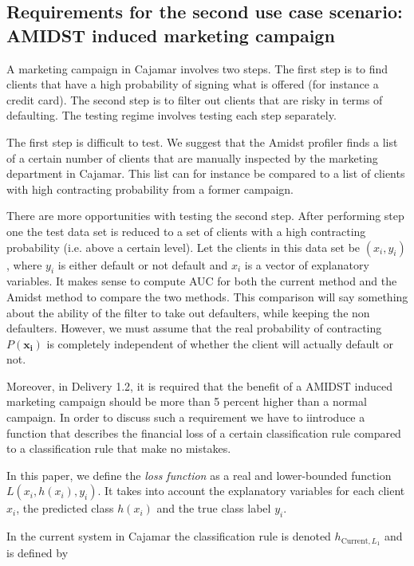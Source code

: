 \documentclass{article}
\theoremstyle{theorem}
\theoremstyle{definition}
\newcommand{\bv}[1]{\bm{#1}}
\begin{document}
\subsection{Requirements for the second use case scenario:  AMIDST induced marketing campaign}

A marketing campaign in Cajamar involves two steps.  The first step is to find clients that have a high probability of signing what is offered (for instance a credit card).  The second step is to filter out clients that are risky in terms of defaulting.
The testing regime involves testing each step separately.

The first step is difficult to test. We suggest that the Amidst profiler finds a list of a certain number of clients that are manually inspected by the marketing department in Cajamar. This list can for instance be compared to a list of clients with high contracting probability from a former campaign.

There are more opportunities with testing the second step.  After performing step one the test data set is reduced to a set of clients with a high contracting probability (i.e. above a certain level).  Let the clients in this data set be $(x_i, y_i)$, where $y_i$ is either default or not default and $x_i$ is a vector of explanatory variables.  It makes sense to compute AUC for both the current method and the Amidst method to compare the two methods.  This comparison will say something about the ability of the filter to take out defaulters, while keeping the non defaulters.  However, we must assume that the real probability of contracting $P(\bv{x_i})$ is completely independent of whether the client will actually default or not.

Moreover, in Delivery 1.2, it is required that the benefit of a AMIDST induced marketing campaign should be more than 5 percent higher than a normal campaign.  In order to discuss such a requirement we have to iintroduce a function that describes the financial loss of a certain classification rule compared to a classification rule that make no mistakes. 

In this paper, we define the \emph{loss function} as a real and lower-bounded function $L(x_i, h(x_i), y_i)$. It takes into account the explanatory variables for each client $x_i$, the predicted class $h(x_i)$ and the true class label $y_i$. 

In the current system in Cajamar the classification rule is denoted $h_{\mbox{Current},L_1}$ and is defined by
\end{document}

